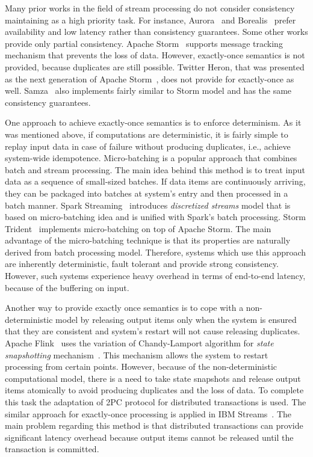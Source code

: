 
\label {fs-related-seciton}

Many prior works in the field of stream processing do not consider consistency maintaining as a high priority task. For instance, Aurora~\cite{Abadi:2003:ANM:950481.950485} and Borealis~\cite{abadi2005design} prefer availability and low latency rather than consistency guarantees. Some other works provide only partial consistency. Apache Storm~\cite{apache:storm} supports message tracking mechanism that prevents the loss of data. However, exactly-once semantics is not provided, because duplicates are still possible. Twitter Heron, that was presented as the next generation of Apache Storm~\cite{Kulkarni:2015:THS:2723372.2742788}, does not provide for exactly-once as well. Samza~\cite{Noghabi:2017:SSS:3137765.3137770} also implements fairly similar to Storm model and has the same consistency guarantees.  

One approach to achieve exactly-once semantics is to enforce determinism. As it was mentioned above, if computations are deterministic, it is fairly simple to replay input data in case of failure without producing duplicates, i.e., achieve system-wide idempotence. Micro-batching is a popular approach that combines batch and stream processing. The main idea behind this method is to treat input data as a sequence of small-sized batches. If data items are continuously arriving, they can be packaged into batches at system's entry and then processed in a batch manner. Spark Streaming~\cite{Zaharia:2012:DSE:2342763.2342773} introduces {\it discretized streams} model that is based on micro-batching idea and is unified with Spark's batch processing. Storm Trident~\cite{apache:storm:trident} implements micro-batching on top of Apache Storm. The main advantage of the micro-batching technique is that its properties are naturally derived from batch processing model. Therefore, systems which use this approach are inherently deterministic, fault tolerant and provide strong consistency. However, such systems experience heavy overhead in terms of end-to-end latency, because of the buffering on input.

Another way to provide exactly once semantics is to cope with a non-deterministic model by releasing output items only when the system is ensured that they are consistent and system's restart will not cause releasing duplicates. Apache Flink~\cite{Carbone:2017:SMA:3137765.3137777} uses the variation of Chandy-Lamport algorithm for {\it state snapshotting} mechanism~\cite{2015arXiv150608603C}. This mechanism allows the system to restart processing from certain points. However, because of the non-deterministic computational model, there is a need to take state snapshots and release output items atomically to avoid producing duplicates and the loss of data. To complete this task the adaptation of 2PC protocol for distributed transactions is used. The similar approach for exactly-once processing is applied in IBM Streams~\cite{jacques2016consistent}. The main problem regarding this method is that distributed transactions can provide significant latency overhead because output items cannot be released until the transaction is committed. 

